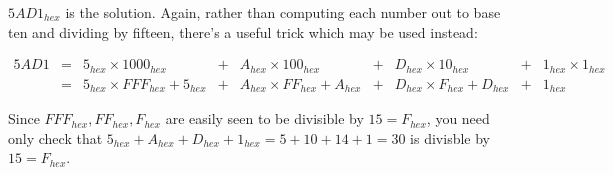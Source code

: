 


\(5AD1_{hex}\) is the solution. Again, rather than computing each number out
to base ten and dividing by fifteen, there's a useful trick which may be
used instead:

\[
  \begin{array}{rcccccccc}
  5AD1 & = & 5_{hex}\times1000_{hex} &+& A_{hex}\times100_{hex} &+& D_{hex}\times10_{hex} &+& 1_{hex}\times1_{hex} \\
       & = & 5_{hex}\times FFF_{hex}+5_{hex} &+& A_{hex}\times FF_{hex}+A_{hex} &+& D_{hex}\times F_{hex}+D_{hex} &+& 1_{hex}
  \end{array}
\]

Since \(FFF_{hex},FF_{hex},F_{hex}\) are easily seen to be divisible by
\(15=F_{hex}\), you need only check that
\(5_{hex}+A_{hex}+D_{hex}+1_{hex}=5+10+14+1=30\)
is divisble by \(15=F_{hex}\).
